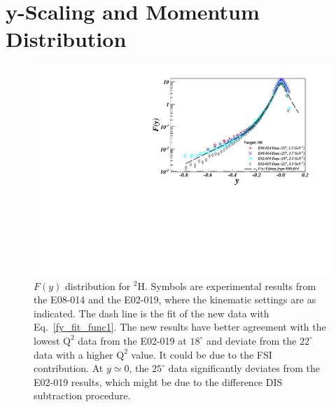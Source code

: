 \section{y-Scaling and Momentum Distribution}
 \begin{figure}[!ht]
  \begin{center}
    \includegraphics[type=pdf,ext=.pdf,read=.pdf,width=.90\textwidth]{./figures/xs/H2_XGT2_Fy}
    \caption[$F(y)$ distribution for $\mathrm{^{2}H}$]{\footnotesize{$F(y)$ distribution for $\mathrm{^{2}H}$. Symbols are experimental results from the E08-014 and the E02-019, where the kinematic settings are as indicated. The dash line is the fit of the new data with Eq.~\eqref{fy_fit_func1}. The new results have better agreement with the lowest $\mathrm{Q^{2}}$ data from the E02-019 at $18^{\circ}$ and deviate from the $22^{\circ}$ data with a higher $\mathrm{Q^{2}}$ value. It could be due to the FSI contribution. At $y\simeq 0$, the $25^{\circ}$ data significantly deviates from the E02-019 results, which might be due to the difference DIS subtraction procedure.}}
    \label{fy_h2_xgt2}
  \end{center}
\end{figure}
